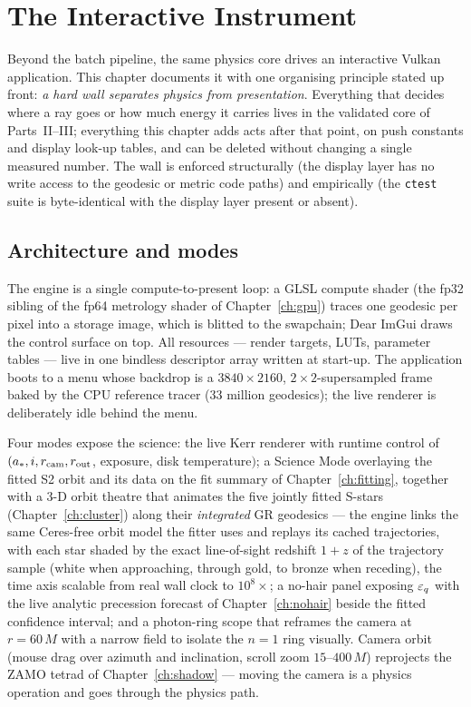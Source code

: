 \chapter{The Interactive Instrument}
\label{ch:instrument}

Beyond the batch pipeline, the same physics core drives an interactive
Vulkan application. This chapter documents it with one organising
principle stated up front: \emph{a hard wall separates physics from
presentation}. Everything that decides where a ray goes or how much
energy it carries lives in the validated core of
Parts~II--III; everything this chapter adds acts after that point, on
push constants and display look-up tables, and can be deleted without
changing a single measured number. The wall is enforced structurally
(the display layer has no write access to the geodesic or metric code
paths) and empirically (the \texttt{ctest} suite is byte-identical with
the display layer present or absent).

\section{Architecture and modes}
\label{sec:instrumentarch}

The engine is a single compute-to-present loop: a GLSL compute shader
(the fp32 sibling of the fp64 metrology shader of
Chapter~\ref{ch:gpu}) traces one geodesic per pixel into a storage
image, which is blitted to the swapchain; Dear ImGui draws the control
surface on top. All resources — render targets, LUTs, parameter
tables — live in one bindless descriptor array written at start-up.
The application boots to a menu whose backdrop is a $3840\times2160$,
$2\times2$-supersampled frame baked by the CPU reference tracer (33
million geodesics); the live renderer is deliberately idle behind the
menu.

Four modes expose the science: the live Kerr renderer with runtime
control of $(a_*, i, r_{\rm cam}, r_{\rm out}$, exposure, disk
temperature$)$; a Science Mode overlaying the fitted S2 orbit and its
data on the fit summary of Chapter~\ref{ch:fitting}, together with a
3-D orbit theatre that animates the five jointly fitted S-stars
(Chapter~\ref{ch:cluster}) along their \emph{integrated} GR geodesics
— the engine links the same Ceres-free orbit model the fitter uses and
replays its cached trajectories, with each star shaded by the exact
line-of-sight redshift $1+z$ of the trajectory sample (white when
approaching, through gold, to bronze when receding), the time axis
scalable from real \sgra{} wall clock to $10^{8}\times$; a no-hair panel
exposing $\varepsilon_q$ with the live analytic precession forecast of
Chapter~\ref{ch:nohair} beside the fitted confidence interval; and a
photon-ring scope that reframes the camera at $r = 60\,M$ with a narrow
field to isolate the $n=1$ ring visually. Camera orbit (mouse drag over
azimuth and inclination, scroll zoom $15$--$400\,M$) reprojects the
ZAMO tetrad of Chapter~\ref{ch:shadow} — moving the camera is a physics
operation and goes through the physics path.

